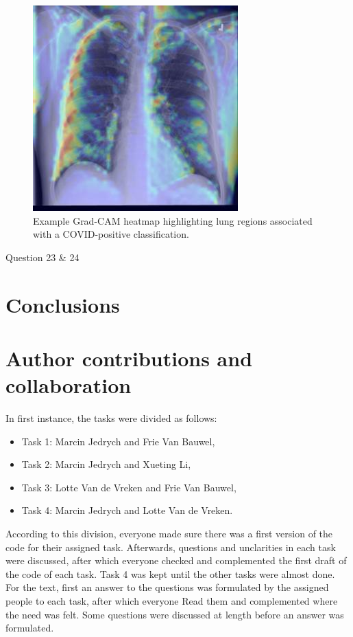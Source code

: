 \documentclass[conference]{IEEEtran}
\begin{document}
\begin{figure}[h] \centering \includegraphics[width=0.8\columnwidth]{gradcam_example.png} \caption{Example Grad-CAM heatmap highlighting lung regions associated with a COVID-positive classification.} \label{fig:gradcam_example} \end{figure}

Question 23 \& 24

\section{Conclusions}\label{sec:conclusion}

\section{Author contributions and collaboration}\label{sec:author_contributions}
In first instance, the tasks were divided as follows:
\begin{itemize}
	\item Task 1: Marcin Jedrych and Frie Van Bauwel, 
	\item Task 2: Marcin Jedrych and Xueting Li,
	\item Task 3: Lotte Van de Vreken and Frie Van Bauwel,
	\item Task 4: Marcin Jedrych and Lotte Van de Vreken.
\end{itemize}

According to this division, everyone made sure there was a first version of the code for their assigned task. Afterwards, questions and unclarities in each task were discussed, after which everyone checked and complemented the first draft of the code of each task. Task 4 was kept until the other tasks were almost done. For the text, first an answer to the questions was formulated by the assigned people to each task, after which everyone Read them and complemented where the need was felt. Some questions were discussed at length before an answer was formulated.
\end{document}

